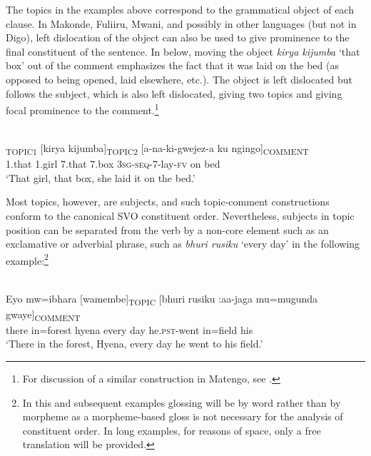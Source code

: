 \documentclass[output=paper]{langsci/langscibook}
\begin{document}
The topics in the examples above correspond to the grammatical object of each clause. In Makonde, Fuliiru, Mwani, and possibly in other languages (but not in Digo), left dislocation of the object can also be used to give prominence to the final constituent of the sentence. In  below, moving the object \textit{kirya kijumba} ‘that box’ out of the comment emphasizes the fact that it was laid on the bed (as opposed to being opened, laid elsewhere, etc.). The object is left dislocated but follows the subject, which is also left dislocated, giving two topics and giving focal prominence to the comment.\footnote{For discussion of a similar construction in Matengo, see \citet[756--758]{yoneda2011}.}

\ea\label{ex:4.nicolle}
\\
\textsubscript{TOPIC1} [kirya kijumba]\textsubscript{TOPIC2} [a-na-ki-gwejez-a ku ngingo]\textsubscript{COMMENT}\\
{\db}1.that 1.girl {\db}7.that 7.box {\db}\textsc{3sg-seq}-7-lay-\textsc{fv} on bed\\
\glt ‘That girl, that box, she laid it on the bed.’
\z

Most topics, however, are subjects, and such topic-comment constructions conform to the canonical SVO constituent order. Nevertheless, subjects in topic position can be separated from the verb by a non-core element such as an exclamative or adverbial phrase, such as \textit{bhuri rusiku} ‘every day’ in the following example:\footnote{In this and subsequent examples glossing will be by word rather than by morpheme as a morpheme-based gloss is not necessary for the analysis of constituent order. In long examples, for reasons of space, only a free translation will be provided.}


\ea\label{ex:5.nicolle}
\\
\gll Eyo mw=ibhara [wamembe]\textsubscript{TOPIC} [bhuri rusiku :aa-jaga{\rmfnm} mu=mugunda gwaye]\textsubscript{COMMENT}\\
there in=forest {\db}hyena {\db}every  day he.\textsc{pst}-went in=field his \\ 
\glt ‘There in the forest, Hyena, every day he went to his field.’
\z

\end{document}
